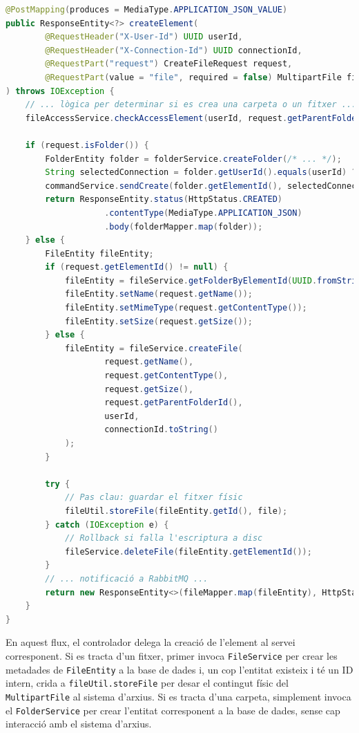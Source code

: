 \begin{lstlisting}[language=Java, caption={Endpoint per a la creació d'elements amb `MultipartFile` a `ElementController`}]
@PostMapping(produces = MediaType.APPLICATION_JSON_VALUE)
public ResponseEntity<?> createElement(
        @RequestHeader("X-User-Id") UUID userId,
        @RequestHeader("X-Connection-Id") UUID connectionId,
        @RequestPart("request") CreateFileRequest request,
        @RequestPart(value = "file", required = false) MultipartFile file
) throws IOException {
    // ... lògica per determinar si es crea una carpeta o un fitxer ...
    fileAccessService.checkAccessElement(userId, request.getParentFolderId(), true, AccessType.WRITE);

    if (request.isFolder()) {
        FolderEntity folder = folderService.createFolder(/* ... */);
        String selectedConnection = folder.getUserId().equals(userId) ? connectionId.toString() : null;
        commandService.sendCreate(folder.getElementId(), selectedConnection, folder.getUserId().toString(), folder.getParent(), "", folder.getName(), "folder");  
        return ResponseEntity.status(HttpStatus.CREATED)
                    .contentType(MediaType.APPLICATION_JSON)
                    .body(folderMapper.map(folder));
    } else {
        FileEntity fileEntity;
        if (request.getElementId() != null) {
            fileEntity = fileService.getFolderByElementId(UUID.fromString(request.getElementId()), false);
            fileEntity.setName(request.getName());
            fileEntity.setMimeType(request.getContentType());
            fileEntity.setSize(request.getSize());
        } else {
            fileEntity = fileService.createFile(
                    request.getName(),
                    request.getContentType(),
                    request.getSize(),
                    request.getParentFolderId(),
                    userId,
                    connectionId.toString()
            );
        }
        
        try {
            // Pas clau: guardar el fitxer físic
            fileUtil.storeFile(fileEntity.getId(), file);
        } catch (IOException e) {
            // Rollback si falla l'escriptura a disc
            fileService.deleteFile(fileEntity.getElementId());
        }
        // ... notificació a RabbitMQ ...
        return new ResponseEntity<>(fileMapper.map(fileEntity), HttpStatus.CREATED);
    }
}
\end{lstlisting}

En aquest flux, el controlador delega la creació de l'element al servei corresponent. Si es tracta d'un fitxer, primer invoca \texttt{FileService} per crear les metadades de \texttt{FileEntity} a la base de dades i, un cop l'entitat existeix i té un ID intern, crida a \texttt{fileUtil.storeFile} per desar el contingut físic del \texttt{MultipartFile} al sistema d'arxius. Si es tracta d'una carpeta, simplement invoca el \texttt{FolderService} per crear l'entitat corresponent a la base de dades, sense cap interacció amb el sistema d'arxius.

